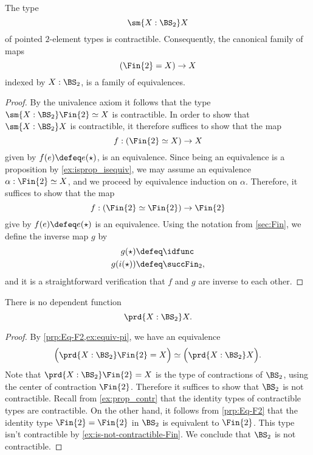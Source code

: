 \begin{prp}\label{prp:Eq-F2}
  The type
  \begin{equation*}
    \sm{X:\BS_2}X
  \end{equation*}
  of pointed $2$-element types is contractible. Consequently, the canonical family of maps
  \begin{equation*}
    (\Fin{2}= X) \to X
  \end{equation*}
  indexed by $X:\BS_2$, is a family of equivalences.
\end{prp}

\begin{proof}
  By the univalence axiom it follows that the type $\sm{X:\BS_2}\Fin{2}\simeq X$ is contractible. In order to show that $\sm{X:\BS_{2}}X$ is contractible, it therefore suffices to show that the map
  \begin{equation*}
    f: (\Fin{2}\simeq X)\to X
  \end{equation*}
  given by $f(e)\defeq e(\star)$, is an equivalence. Since being an equivalence is a proposition by \cref{ex:isprop_isequiv}, we may assume an equivalence $\alpha:\Fin{2}\simeq X$, and we proceed by equivalence induction on $\alpha$. Therefore, it suffices to show that the map
  \begin{equation*}
    f: (\Fin{2}\simeq \Fin{2})\to\Fin{2}
  \end{equation*}
  give by $f(e)\defeq e(\star)$ is an equivalence. Using the notation from \cref{sec:Fin}, we define the inverse map $g$ by
  \begin{align*}
    g(\star) & \defeq \idfunc \\
    g(i(\star)) & \defeq \succFin_2,
  \end{align*}
  and it is a straightforward verification that $f$ and $g$ are inverse to each other.
\end{proof}

\begin{cor}\label{cor:no-section-F2}
  There is no dependent function
  \begin{equation*}
    \prd{X:\BS_2}X.
  \end{equation*}
\end{cor}

\begin{proof}
  By \cref{prp:Eq-F2,ex:equiv-pi}, we have an equivalence
  \begin{equation*}
    \Big(\prd{X:\BS_2}\Fin{2}=X\Big)\simeq \Big(\prd{X:\BS_2}X\Big).
  \end{equation*}
  Note that $\prd{X:\BS_2}\Fin{2}=X$ is the type of contractions of $\BS_2$, using the center of contraction $\Fin{2}$. Therefore it suffices to show that $\BS_2$ is not contractible. Recall from \cref{ex:prop_contr} that the identity types of contractible types are contractible. On the other hand, it follows from \cref{prp:Eq-F2} that the identity type $\Fin{2}=\Fin{2}$ in $\BS_2$ is equivalent to $\Fin{2}$. This type isn't contractible by \cref{ex:is-not-contractible-Fin}. We conclude that $\BS_2$ is not contractible.
\end{proof}

